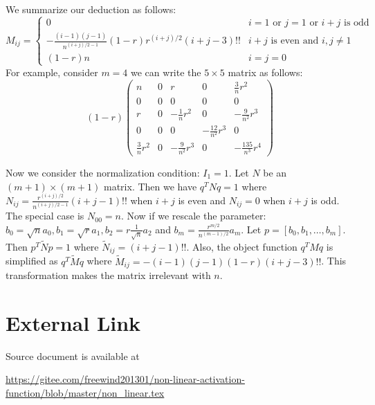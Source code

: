 \documentclass{article}
\begin{document}
We summarize our deduction as follows:
\begin{equation}
M_{ij} = \begin{cases} 0 & i=1 \textrm{ or } j=1 \textrm{ or } i + j \textrm{ is odd} \\
 -\frac{(i-1)(j-1)}{n^{(i+j)/2-1}} (1-r)r^{(i+j)/ 2 } (i+j-3)!! & i+j \textrm{ is even and } i,j \neq 1 \\
(1-r)n & i=j=0
\end{cases}
\end{equation}
For example, consider $m = 4$ we can write the $ 5 \times 5 $ matrix as follows:
$$
(1-r)\begin{pmatrix}
n & 0 & r  & 0 & \frac{3}{n}r^2\\
0 & 0 & 0  & 0 & 0\\
r &  0 & -\frac{1}{n} r^2 & 0 & -\frac{9}{n^2} r^3 \\
0 & 0 & 0 & -\frac{12}{n^2}r^3 & 0 \\
\frac{3}{n}r^2 & 0 & -\frac{9}{n^2} r^3 & 0 & -\frac{135}{n^3}r^4 
\end{pmatrix}
$$

Now we consider the normalization condition: $I_1 = 1$. Let $N$ be an $(m+1) \times (m+1)$ matrix.
Then we have $q^T N q = 1$ where $N_{ij} = \frac{r^{(i+j) / 2}}{n^{(i+j)/2 -1}} (i+j -1)!!$ when $i+j$ is even and $N_{ij} = 0$ when $i+j$ is odd. The special case is $N_{00} = n$. Now if we rescale the parameter: $b_0 = \sqrt{n} a_0, b_1 = \sqrt{r} a_1, b_2 = r \frac{1}{\sqrt{n}} a_2$ and $b_m = \frac{r^{m/2}}{n^{(m-1)/2}} a_m$. Let $p = [b_0, b_1, \dots, b_m]$. Then $p^T \widetilde{N} p =1$ where $\widetilde{N}_{ij} =  (i+j -1)!!$. Also, the object function $q^T M q$ is simplified as $q^T \widetilde{M} q$ where $\widetilde{M}_{ij} =  -(i-1)(j-1)(1-r) (i+j-3)!! $. This transformation makes the matrix irrelevant with $n$.

\section{External Link}
Source document is available at 

\url{https://gitee.com/freewind201301/non-linear-activation-function/blob/master/non_linear.tex}
\end{document}
